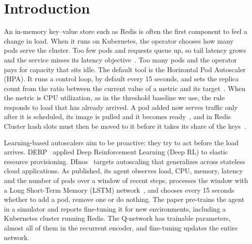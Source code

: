 \section{Introduction}\label{sec:intro}

An in-memory key--value store such as Redis is often the first component to feel a change in load. When it runs
on Kubernetes, the operator chooses how many pods serve the cluster. Too few pods and requests queue up, so tail
latency grows and the service misses its latency objective~\cite{dean2013tail}. Too many pods and the operator
pays for capacity that sits idle. The default tool is the Horizontal Pod Autoscaler (HPA). It runs a control
loop, by default every 15 seconds, and sets the replica count from the ratio between the current value of a
metric and its target~\cite{k8sdocs_hpa}. When the metric is CPU utilization, as in the
threshold baseline we use, the rule responds to load that has already arrived. A pod added now serves traffic only after it is scheduled, its image
is pulled and it becomes ready~\cite{k8sslos,harter2016slacker}, and in Redis Cluster hash slots must then be
moved to it before it takes its share of the keys~\cite{redisdocs_scaling,redisdocs_clusterspec}.

Learning-based autoscalers aim to be proactive: they try to act before the load arrives.
DERP~\cite{bitsakos2018derp} applied Deep Reinforcement Learning (Deep RL) to elastic resource provisioning. DInos~\cite{bitsakos2025dinos} targets autoscaling
that generalizes across stateless cloud applications. As published, its agent observes load, CPU, memory,
latency and the number of pods over a window of recent steps, processes the window with a Long Short-Term Memory
(LSTM) network~\cite{hochreiter1997lstm}, and chooses every 15 seconds whether to add a pod, remove one or do
nothing. The paper pre-trains the agent in a simulator and reports fine-tuning it for new environments, including
a Kubernetes cluster running Redis. The Q-network has \resParamsDInos{}
trainable parameters, almost all of them in the recurrent encoder, and fine-tuning updates the entire network.

